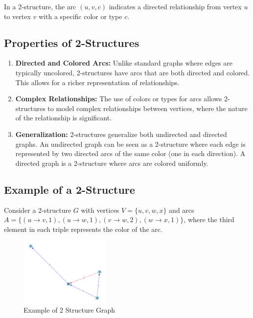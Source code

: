 In a 2-structure, the arc $(u, v, c)$ indicates a directed relationship from vertex $u$ to vertex $v$ with a specific color or type $c$.

\subsection*{Properties of 2-Structures}

\begin{enumerate}
    \item \textbf{Directed and Colored Arcs:} Unlike standard graphs where edges are typically uncolored, 2-structures have arcs that are both directed and colored.
    This allows for a richer representation of relationships.
    \item \textbf{Complex Relationships:} The use of colors or types for arcs allows 2-structures to model complex relationships between vertices, where the nature of the relationship is significant.
    \item \textbf{Generalization:} 2-structures generalize both undirected and directed graphs.
    An undirected graph can be seen as a 2-structure where each edge is represented by two directed arcs of the same color (one in each direction).
    A directed graph is a 2-structure where arcs are colored uniformly.
\end{enumerate}

\subsection*{Example of a 2-Structure}

Consider a 2-structure $G$ with vertices $V = \{u, v, w, x\}$ and arcs $A = \{(u \rightarrow v, 1), (u \rightarrow w, 1), (v \rightarrow w, 2), (w \rightarrow x, 1)\}$, where the third element in each triple represents the color of the arc.

\begin{figure}[!h]
    \centering
    \includegraphics[width=0.40\textwidth]{images/graphs/2_structure_graph_example}
    \caption{Example of 2 Structure Graph}
    \label{fig:2-structure-graph-example}
\end{figure}


